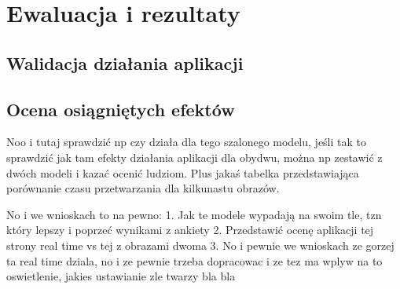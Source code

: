 \chapter{Ewaluacja i rezultaty}
\label{cha:ewaluacjaIRezultaty}

\section{Walidacja działania aplikacji}
\section{Ocena osiągniętych efektów}
Noo i tutaj sprawdzić np czy działa dla tego szalonego modelu, jeśli tak to sprawdzić jak tam efekty działania aplikacji dla obydwu, można np zestawić z dwóch modeli i kazać ocenić ludziom. Plus jakaś tabelka przedstawiająca porównanie czasu przetwarzania dla kilkunastu obrazów.

No i we wnioskach to na pewno:
1. Jak te modele wypadają na swoim tle, tzn który lepszy i poprzeć wynikami z ankiety
2. Przedstawić ocenę aplikacji tej strony real time vs tej z obrazami dwoma
3. No i pewnie we wnioskach ze gorzej ta real time dziala, no i ze pewnie trzeba dopracowac i ze tez ma wplyw na to oswietlenie, jakies ustawianie zle twarzy bla bla

